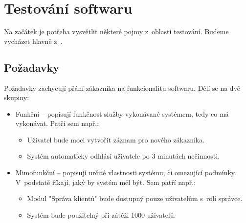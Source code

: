 \chapter{Testování softwaru}



Na začátek je potřeba vysvětlit některé pojmy z~oblasti testování. Budeme vycházet hlavně z~\citep{RizeniKvalitySW}.

	\section{Požadavky}
	Požadavky zachycují přání zákazníka na funkcionalitu softwaru. Dělí se na dvě skupiny:
		\begin{itemize}
			\item Funkční -- popisují funkčnost služby vykonávané systémem, tedy co má vykonávat. Patří sem např.:
				\begin{itemize}
					\item Uživatel bude moci vytvořit záznam pro nového zákazníka.
					\item Systém automaticky odhlásí uživatele po 3 minutách nečinnosti.
				\end{itemize}
			\item Mimofunkční -- popisují určité vlastnosti systému, či omezující podmínky. V~podstatě říkají, jaký by systém měl být. Sem patří např.:
				\begin{itemize}
					\item Modul "Správa klientů" bude dostupný pouze uživatelům s~rolí správce.
					\item Systém bude použitelný při zátěži 1000 uživatelů.
				\end{itemize}
		\end{itemize}
	
